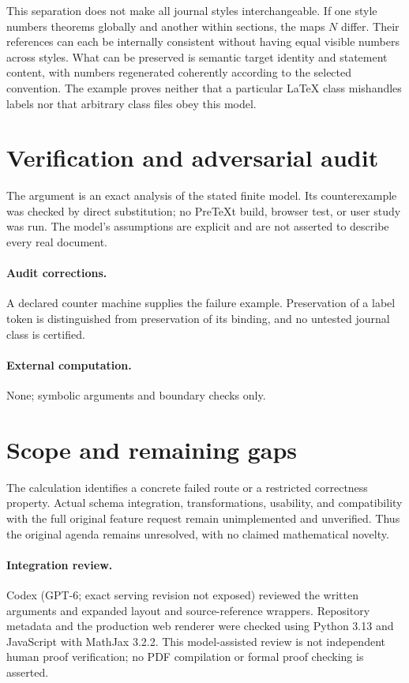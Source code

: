 \documentclass[11pt]{article}
\begin{document}
This separation does not make all journal styles interchangeable. If one style numbers theorems globally and another within sections, the maps $N$ differ. Their references can each be internally consistent without having equal visible numbers across styles. What can be preserved is semantic target identity and statement content, with numbers regenerated coherently according to the selected convention. The example proves neither that a particular LaTeX class mishandles labels nor that arbitrary class files obey this model.
\section{Verification and adversarial audit}
The argument is an exact analysis of the stated finite model. Its counterexample was checked by direct substitution; no PreTeXt build, browser test, or user study was run. The model's assumptions are explicit and are not asserted to describe every real document.
\paragraph{Audit corrections.} A declared counter machine supplies the failure example. Preservation of a label token is distinguished from preservation of its binding, and no untested journal class is certified.
\paragraph{External computation.} None; symbolic arguments and boundary checks only.
\section{Scope and remaining gaps}
The calculation identifies a concrete failed route or a restricted correctness property. Actual schema integration, transformations, usability, and compatibility with the full original feature request remain unimplemented and unverified. Thus the original agenda remains unresolved, with no claimed mathematical novelty.
\paragraph{Integration review.} Codex (GPT-6; exact serving revision not exposed) reviewed the written arguments and expanded layout and source-reference wrappers. Repository metadata and the production web renderer were checked using Python 3.13 and JavaScript with MathJax 3.2.2. This model-assisted review is not independent human proof verification; no PDF compilation or formal proof checking is asserted.
\end{document}
